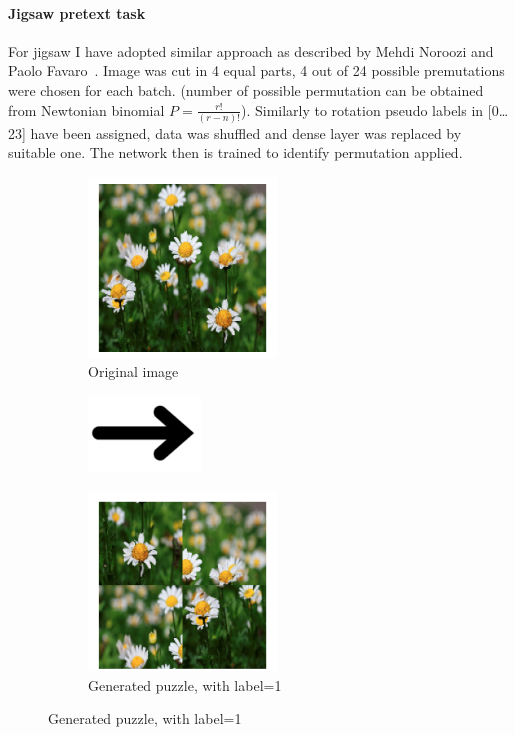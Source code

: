 \paragraph{Jigsaw pretext task}
For jigsaw I have adopted similar approach as described by Mehdi Noroozi and Paolo Favaro~\cite{DBLP:journals/corr/NorooziF16}.
Image was cut in 4 equal parts, 4 out of 24 possible premutations were chosen for each batch.
(number of possible permutation can be obtained from Newtonian binomial $P=\frac{r!}{(r-n)!}$).
Similarly to rotation pseudo labels in [0\ldots23] have been assigned, data was shuffled and dense layer was replaced by suitable one.
The network then is trained to identify permutation applied.
\\
\begin{figure}
    \begin{subfigure}{0.33\textwidth}
        \caption{Original image}
        \includegraphics[width=5cm]{images/dandelion}
    \end{subfigure}
    \begin{subfigure}{0.2\textwidth}
        \includegraphics[width=3cm]{images/arrow}
    \end{subfigure}
    \begin{subfigure}{0.33\textwidth}
        \caption{Generated puzzle, with label=1}
        \includegraphics[width=5cm]{images/puzzle}
    \end{subfigure}
\end{figure}

